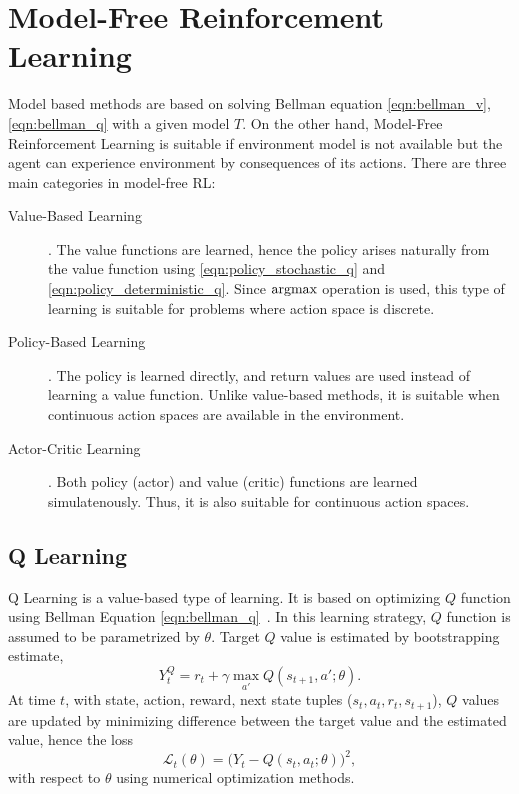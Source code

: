 \section{Model-Free Reinforcement Learning}
\label{sec:mf_rl}

Model based methods are based on solving Bellman equation \eqref{eqn:bellman_v}, \eqref{eqn:bellman_q} with a given model $T$. 
On the other hand, Model-Free Reinforcement Learning is suitable 
if environment model is not available but the agent can experience environment by consequences of its actions. There are three main categories in model-free RL:  

\begin{description}
	\item[Value-Based Learning]. The value functions are learned, 
	hence the policy arises naturally from the value function using  \eqref{eqn:policy_stochastic_q} and \eqref{eqn:policy_deterministic_q}. 
	Since $\operatorname{\textup{argmax}}$ operation is used, this type of learning is suitable for problems where action space is discrete. 
	
	\item[Policy-Based Learning]. The policy is learned directly, 
	and return values are used instead of learning a value function. 
	Unlike value-based methods, it is suitable when continuous action spaces are available in the environment. 
	
	\item[Actor-Critic Learning]. Both policy (actor) and value (critic) functions are learned simulatenously. 
	Thus, it is also suitable for continuous action spaces. 
	
\end{description}

\subsection{Q Learning}
Q Learning is a value-based type of learning. 
It is based on optimizing $Q$ function using Bellman Equation \eqref{eqn:bellman_q}~\cite{watkins_technical_1992}. 
In this learning strategy, $Q$ function is assumed to be parametrized by $\theta$. 
Target $Q$ value is estimated by bootstrapping estimate, 
\begin{equation}
\label{eqn:q_target}
Y_t^Q = r_t + \gamma \max_{a'} Q(s_{t+1},a';\theta).
\end{equation}
At time $t$,  with state, action, reward, next state tuples ($s_t,a_t,r_t,s_{t+1}$), 
$Q$ values are updated by minimizing difference between the target value and the estimated value, hence the loss 
\begin{equation}
\label{eqn:q_loss}
\mathcal{L}_t(\theta) = \big( Y_t - Q(s_t,a_t;\theta) \big) ^ 2, 
\end{equation}
with respect to $\theta$ using numerical optimization methods. 

